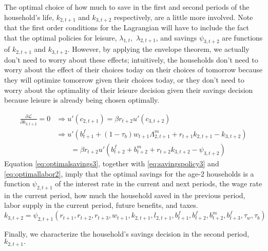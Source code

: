\documentclass[ProjectUYA]{subfiles}
\begin{document}
The optimal choice of how much to save in the first and second periods of the household's life, $k_{2,t+1}$ and $k_{3,t+2}$ respectively, are a little more involved. Note that the first order conditions for the Lagrangian will have to include the fact that the optimal policies for leisure, $\lambda_{1,t},$ $\lambda_{2,t+1}$, and savings $\psi_{3,t+2}$ are functions of 
$k_{2,t+1}$ and $k_{3,t+2}$. However, by applying the envelope theorem, we actually don't need to worry about these effects; intuitively, the households don't need to worry about the effect of their choices today on their choices of tomorrow because they will optimize tomorrow given their choices today, or they don't need to worry about the optimality of their leisure decision given their savings decision because leisure is already being chosen optimally. 


\begin{equation}
	\label{eq:optimalsavings3}
	\begin{aligned}
		\frac{\partial\mathcal{L}}{\partial k_{3,t+2}}=0 & \Rightarrow u'(c_{2,t+1})=\beta r_{t+2}
		u'(c_{3,t+2}) \\
		&\Rightarrow u'\left(b_{t+1}^f+(1-\tau_b)w_{t+1} \Lambda_{2,t+1}^m + r_{t+1}k_{2,t+1} -k_{3,t+2}\right) \\
		&\qquad = \beta r_{t+2}
		u'\left(b_{t+2}^f+ b_{t+2}^m  + r_{t+2}k_{3,t+2} -\psi_{3,t+2}\right)
\end{aligned}
\end{equation}
Equation \eqref{eq:optimalsavings3}, together with \eqref{eq:savingspolicy3} and \eqref{eq:optimallabor2}, imply that the optimal savings for the age-2 households is a function $\psi_{2,t+1}$ of the interest rate in the current and next periods, the wage rate in the current period, how much the household saved in the previous period, labor supply in the current period, future benefits, and taxes. 
\begin{equation}
	\label{eq:savingspolicy2}
	k_{3,t+2}=\psi_{2,t+1}(r_{t+1},r_{t+2},r_{t+3},w_{t+1}, k_{2,t+1},l_{2,t+1},b_{t+1}^f,b_{t+2}^f,b_{t+2}^m,b_{t+3}^f,\tau_w,\tau_b)
\end{equation}

Finally, we characterize the household's savings decision in the second period, $k_{2,t+1}.$
\end{document}
